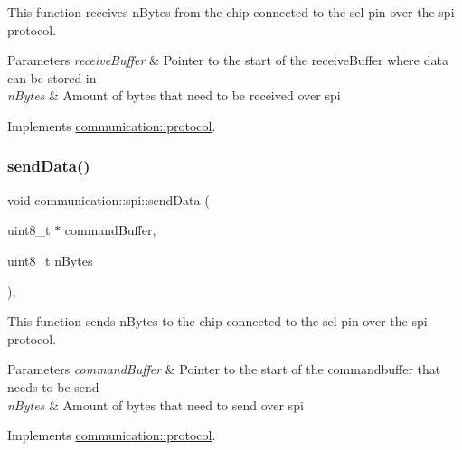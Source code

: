 This function receives n\+Bytes from the chip connected to the sel pin over the spi protocol. 


\begin{DoxyParams}{Parameters}
{\em receive\+Buffer} & Pointer to the start of the receive\+Buffer where data can be stored in \\
\hline
{\em n\+Bytes} & Amount of bytes that need to be received over spi \\
\hline
\end{DoxyParams}


Implements \hyperlink{classcommunication_1_1protocol_ad0d43530ae3db2b14a6e9c1f77aa530a}{communication\+::protocol}.

\mbox{\label{classcommunication_1_1spi_a4b0a72ad237253179cff221d92711596}} 
\subsubsection{\texorpdfstring{send\+Data()}{sendData()}}
{\footnotesize\ttfamily void communication\+::spi\+::send\+Data (\begin{DoxyParamCaption}\item[{uint8\+\_\+t $\ast$}]{command\+Buffer,  }\item[{uint8\+\_\+t}]{n\+Bytes }\end{DoxyParamCaption})\hspace{0.3cm}{\ttfamily [override]}, {\ttfamily [virtual]}}



This function sends n\+Bytes to the chip connected to the sel pin over the spi protocol. 


\begin{DoxyParams}{Parameters}
{\em command\+Buffer} & Pointer to the start of the commandbuffer that needs to be send \\
\hline
{\em n\+Bytes} & Amount of bytes that need to send over spi \\
\hline
\end{DoxyParams}


Implements \hyperlink{classcommunication_1_1protocol_a1745c4aac1b27bac2d350be54fedc388}{communication\+::protocol}.

\mbox{\label{classcommunication_1_1spi_a7bc104e72a3f9efc946ef5ffdebfcc2a}} 
